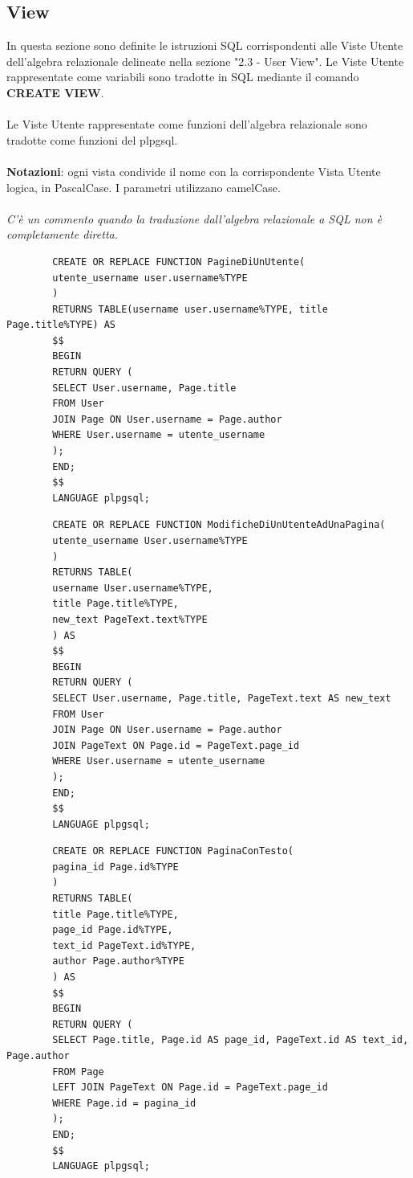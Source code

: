 \documentclass{article}
\begin{document}
	\newpage
	
	\subsection{View}
	In questa sezione sono definite le istruzioni SQL corrispondenti alle Viste Utente
	dell'algebra relazionale delineate nella sezione "2.3 - User View". Le Viste Utente
	rappresentate come variabili sono tradotte in SQL mediante il comando \textbf{CREATE VIEW}.
	\\\\
	Le Viste Utente rappresentate come funzioni dell'algebra relazionale sono tradotte come
	funzioni del plpgsql.
	\\\\
	\textbf{Notazioni}: ogni vista condivide il nome con la corrispondente Vista Utente
	logica, in PascalCase. I parametri utilizzano camelCase.\\\\
	{\itshape	C'è un commento quando la traduzione dall'algebra relazionale a SQL
		non è completamente diretta.}
	
	\begin{lstlisting}
		CREATE OR REPLACE FUNCTION PagineDiUnUtente(
		utente_username user.username%TYPE
		)
		RETURNS TABLE(username user.username%TYPE, title Page.title%TYPE) AS
		$$
		BEGIN
		RETURN QUERY (
		SELECT User.username, Page.title
		FROM User
		JOIN Page ON User.username = Page.author
		WHERE User.username = utente_username
		);
		END;
		$$
		LANGUAGE plpgsql;
	\end{lstlisting}
	
	\begin{lstlisting}
		CREATE OR REPLACE FUNCTION ModificheDiUnUtenteAdUnaPagina(
		utente_username User.username%TYPE
		)
		RETURNS TABLE(
		username User.username%TYPE,
		title Page.title%TYPE,
		new_text PageText.text%TYPE
		) AS
		$$
		BEGIN
		RETURN QUERY (
		SELECT User.username, Page.title, PageText.text AS new_text
		FROM User
		JOIN Page ON User.username = Page.author
		JOIN PageText ON Page.id = PageText.page_id
		WHERE User.username = utente_username
		);
		END;
		$$
		LANGUAGE plpgsql;
	\end{lstlisting}
	
	\begin{lstlisting}
		CREATE OR REPLACE FUNCTION PaginaConTesto(
		pagina_id Page.id%TYPE
		)
		RETURNS TABLE(
		title Page.title%TYPE,
		page_id Page.id%TYPE,
		text_id PageText.id%TYPE,
		author Page.author%TYPE
		) AS
		$$
		BEGIN
		RETURN QUERY (
		SELECT Page.title, Page.id AS page_id, PageText.id AS text_id, Page.author
		FROM Page
		LEFT JOIN PageText ON Page.id = PageText.page_id
		WHERE Page.id = pagina_id
		);
		END;
		$$
		LANGUAGE plpgsql;
	\end{lstlisting}
	
\end{document}
